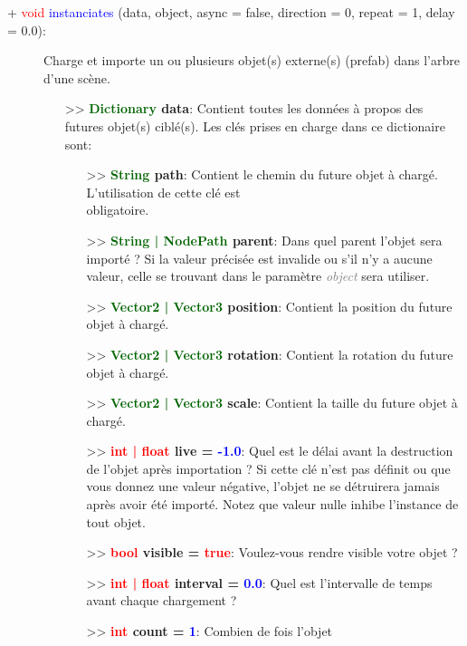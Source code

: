 \documentclass[a4paper, 11pt]{article}
\begin{document}
	\newpage \begin{description}
		\item [+ \textcolor{red}{void} \textcolor{blue}{\hypertarget{instanciates}{instanciates}} (data, 
		object, async = false, direction = 0, repeat = 1, delay = 0.0):] Charge et importe un ou plusieurs 
		objet(s) externe(s) (prefab) dans l'arbre d'une scène.
		\begin{itemize}
			\item [>> \textbf{\textcolor{darkgreen}{Dictionary} data}:] Contient toutes les données à propos 
			des futures objet(s) ciblé(s). Les clés prises en charge dans ce dictionaire sont:
			\begin{itemize}
				\item[>> \textbf{\textcolor{darkgreen}{String} path}:] Contient le chemin du future objet à 
				chargé. L'utilisation de cette clé est \\obligatoire.
				\item[>> \textbf{\textcolor{darkgreen}{String | NodePath} parent}:] Dans quel parent l'objet 
				sera importé ? Si la valeur précisée est invalide ou s'il n'y a aucune valeur, celle se
				trouvant dans le paramètre \textit{\textcolor{gray}{object}} sera utiliser.
				\item[>> \textbf{\textcolor{darkgreen}{Vector2 | Vector3} position}:] Contient la position 
				du future objet à chargé.
				\item[>> \textbf{\textcolor{darkgreen}{Vector2 | Vector3} rotation}:] Contient la rotation 
				du future objet à chargé.
				\item[>> \textbf{\textcolor{darkgreen}{Vector2 | Vector3} scale}: ] Contient la taille du 
				future objet à chargé.
				\item[>> \textbf{\textcolor{red}{int | float} live = \textcolor{blue}{-1.0}}:] Quel est le 
				délai avant la destruction de l'objet après importation ? Si cette clé n'est pas définit ou
				que vous donnez une valeur négative, l'objet ne se détruirera jamais après avoir été 
				importé. Notez que valeur nulle inhibe l'instance de tout objet.
				\item[>> \textbf{\textcolor{red}{bool} visible = \textcolor{red}{true}}:] Voulez-vous rendre 
				visible votre objet ?
				\item[>> \textbf{\textcolor{red}{int | float} interval = \textcolor{blue}{0.0}}:] Quel est 
				l'intervalle de temps avant chaque chargement ?
				\item[>> \textbf{\textcolor{red}{int} count = \textcolor{blue}{1}}:] Combien de fois l'objet 

\end{itemize}
\end{itemize}
\end{description}
\end{document}
